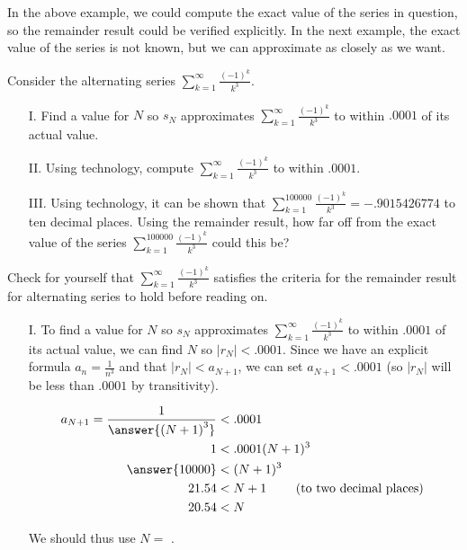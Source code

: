 \documentclass{ximera}
\begin{document}
In the above example, we could compute the exact value of the series in question, so the remainder result could be verified explicitly.  In the next example, the exact value of the series is not known, but we can approximate as closely as we want.

\begin{example}
Consider the alternating series $\sum_{k=1}^{\infty} \frac{(-1)^k}{k^3}$.

\begin{itemize}
\item[I.] Find a value for $N$ so $s_N$ approximates $\sum_{k=1}^{\infty} \frac{(-1)^k}{k^3}$ to within $.0001$ of its actual value.
\item[II.] Using technology, compute $\sum_{k=1}^{\infty} \frac{(-1)^k}{k^3}$ to within $.0001$.
\item[III.] Using technology, it can be shown that $\sum_{k=1}^{100000} \frac{(-1)^k}{k^3} = -.9015426774$ to ten decimal places.  Using the remainder result, how far off from the exact value of the series $\sum_{k=1}^{100000} \frac{(-1)^k}{k^3}$ could this be?
\end{itemize}

\begin{explanation}
Check for yourself that $\sum_{k=1}^{\infty} \frac{(-1)^k}{k^3}$ satisfies the criteria for the remainder result for alternating series to hold before reading on.

\begin{itemize}
\item[I.] To find a value for $N$ so $s_N$ approximates $\sum_{k=1}^{\infty} \frac{(-1)^k}{k^3}$ to within $.0001$ of its actual value, we can find $N$ so $\big|r_N\big| < .0001$.  Since we have an explicit formula $a_n = \frac{1}{n^3}$ and that $\big|r_N\big| < a_{N+1}$, we can set $a_{N+1} < .0001$ (so $|r_N|$ will be less than $.0001$ by transitivity).

\begin{align*}
a_{N+1} = \frac{1}{\answer{\left(N+1\right)^3}} &< .0001 \\
1 &<  .0001 (N+1)^3 \\
\answer{10000} &< (N+1)^3 \\
21.54 &< N+1 \qquad  \textrm{ (to two decimal places) }\\
20.54 &< N \\
\end{align*}

We should thus use $N =$  .


\end{itemize}
\end{explanation}
\end{example}
\end{document}
